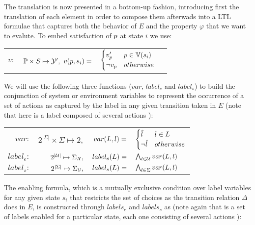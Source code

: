 The translation is now presented in a bottom-up fashion, introducing first the translation of each element in order to compose them afterwads into a LTL formulae that captures both the behavior of $E$ and the property $\varphi$ that we want to evalute. To embed satisfaction of $\proposition$ at state $i$ we use:
\begin{center}
	\begin{tabular}{r r r l}
$v:$ & $\propositions \times S \mapsto \gsY',$
$
v(\proposition,s_i) = $ & $\begin{cases}
v_{\proposition}' & \proposition \in \valuations(s_i) \\
\neg v_{\proposition} & otherwise
\end{cases}
$
\end{tabular}
\end{center}
We will use the following three functions ($var$, $label_e$ and $label_s$) to build the conjunction of system or environment variables to represent the occurrence of a set of actions as captured by the label in any given transition taken in $E$ (note that here \actionLabel is a label composed of several actions \action):
\begin{center}
	\begin{tabular}{r r r l}
$var:$ & $2^{|\Sigma|}\times \Sigma \mapsto 2,$ &
$
var(\actionLabel, \action) = $&
$\begin{cases}
\varLabel{} & \action \in \actionLabel \\
\neg \varLabel{} & otherwise
\end{cases}

$\\
$label_e:$&$2^{|\nonControlSet|}\mapsto \Sigma_{\gsX},$ &
$label_e(\actionLabel) = $&$\bigwedge_{\action \in \nonControlSet}var(\actionLabel, \action)$\\
$label_s:$&$2^{|\Sigma|}\mapsto \Sigma_{\gsV},$ &
$label_s(\actionLabel) = $&$\bigwedge_{\action \in \Sigma}var(\actionLabel, \action)$\\
\end{tabular}
\end{center}

The enabling formula, which is a mutually exclusive condition over label variables for any given state $s_i$ that restricts the set of choices as the transition relation $\Delta$ does in $E$, is constructed through $labels_e$ and $labels_s$ as (note again that  is a set of labels \actionLabel enabled for a particular state, each one consisting of several actions \action):

